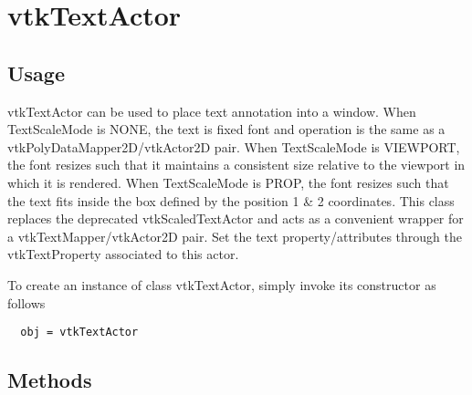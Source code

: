 \section{vtkTextActor}

\subsection{Usage}

 vtkTextActor can be used to place text annotation into a window.
 When TextScaleMode is NONE, the text is fixed font and operation is
 the same as a vtkPolyDataMapper2D/vtkActor2D pair.
 When TextScaleMode is VIEWPORT, the font resizes such that it maintains a
 consistent size relative to the viewport in which it is rendered.
 When TextScaleMode is PROP, the font resizes such that the text fits inside
 the box defined by the position 1 \& 2 coordinates. This class replaces the
 deprecated vtkScaledTextActor and acts as a convenient wrapper for
 a vtkTextMapper/vtkActor2D pair.
 Set the text property/attributes through the vtkTextProperty associated to
 this actor.


To create an instance of class vtkTextActor, simply
invoke its constructor as follows
\begin{verbatim}
  obj = vtkTextActor
\end{verbatim}
\subsection{Methods}

